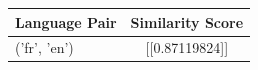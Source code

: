\begin{tabular}{|l|c|}
\hline
Language Pair & Similarity Score \\
\hline
('fr', 'en') & [[0.87119824]] \\
\hline
\end{tabular}

